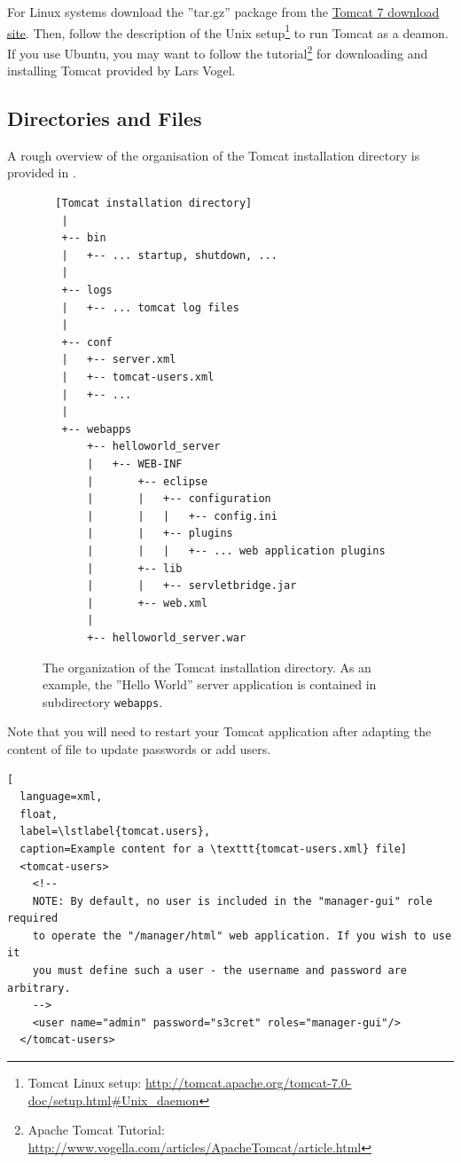 \documentclass[a4paper,10pt,twoside]{book}
\begin{document}
For Linux systems download the ''tar.gz'' package from the \href{http://tomcat.apache.org/download-70.cgi}{Tomcat 7 download site}.
Then, follow the description of the Unix setup\footnote{
Tomcat Linux setup: \url{http://tomcat.apache.org/tomcat-7.0-doc/setup.html#Unix_daemon}
}
to run Tomcat as a deamon.
If you use Ubuntu, you may want to follow the tutorial\footnote{
Apache Tomcat Tutorial: \url{http://www.vogella.com/articles/ApacheTomcat/article.html}
} 
for downloading and installing Tomcat provided by Lars Vogel.


\subsection{Directories and Files}

A rough overview of the organisation of the Tomcat installation directory is provided in .

\begin{figure}
{\tiny
\begin{verbatim}
  [Tomcat installation directory]
   |
   +-- bin
   |   +-- ... startup, shutdown, ...
   |
   +-- logs
   |   +-- ... tomcat log files
   |
   +-- conf
   |   +-- server.xml 
   |   +-- tomcat-users.xml
   |   +-- ...
   |
   +-- webapps
       +-- helloworld_server
       |   +-- WEB-INF
       |       +-- eclipse
       |       |   +-- configuration
       |       |   |   +-- config.ini
       |       |   +-- plugins
       |       |   |   +-- ... web application plugins
       |       +-- lib
       |       |   +-- servletbridge.jar
       |       +-- web.xml
       |
       +-- helloworld_server.war
\end{verbatim}
}
\caption{The organization of the Tomcat installation directory. As an example, the ''Hello World'' server application is contained in subdirectory \texttt{webapps}. }
\end{figure}

Note that you will need to restart your Tomcat application after adapting the content of file  to update passwords or add users.

\begin{lstlisting}[
  language=xml,
  float,
  label=\lstlabel{tomcat.users},
  caption=Example content for a \texttt{tomcat-users.xml} file]
  <tomcat-users>
    <!--
    NOTE: By default, no user is included in the "manager-gui" role required
    to operate the "/manager/html" web application. If you wish to use it
    you must define such a user - the username and password are arbitrary.
    -->
	<user name="admin" password="s3cret" roles="manager-gui"/>
  </tomcat-users>	
\end{lstlisting}
\end{document}
